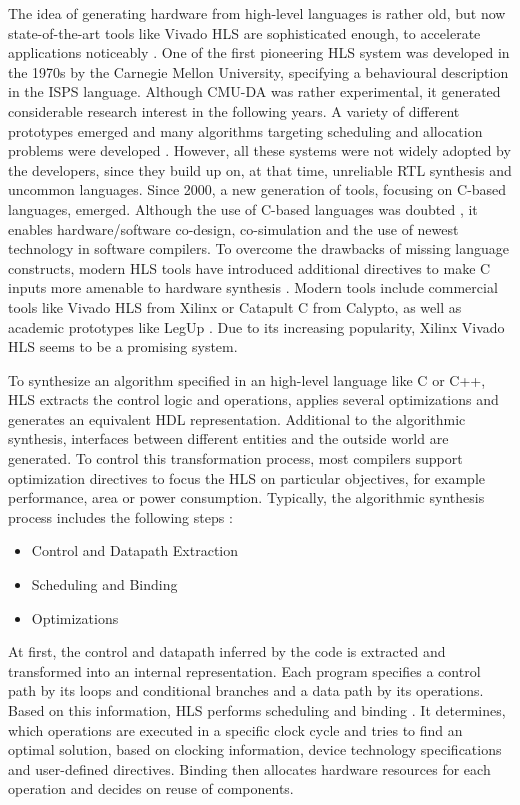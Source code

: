 The idea of generating hardware from high-level languages is rather old, but
now state-of-the-art tools like Vivado HLS are sophisticated enough, to
accelerate applications noticeably \citep{EcEc08,XSA10}. One of the first
pioneering \ac{HLS} system was developed in the 1970s \citep{DPS81} by the
Carnegie Mellon University, specifying a behavioural description in the
\ac{ISPS} language. Although \ac{CMU-DA} was rather experimental, it generated
considerable research interest in the following years. A variety of different
prototypes emerged and many algorithms targeting scheduling and allocation
problems were developed \citep{CBN11}. However, all these systems were not
widely adopted by the developers, since they build up on, at that time,
unreliable \ac{RTL} synthesis and uncommon languages. Since 2000, a new
generation of tools, focusing on C-based languages, emerged. Although the use
of C-based languages was doubted \citep{Edw06}, it enables hardware/software
co-design, co-simulation and the use of newest technology in software
compilers. To overcome the drawbacks of missing language constructs, modern
\ac{HLS} tools have introduced additional directives to make C inputs more
amenable to hardware synthesis \citep{CBN11}. Modern tools include commercial
tools like Vivado HLS from Xilinx or Catapult C from Calypto, as well as
academic prototypes like LegUp \citep{CCA11}. Due to its increasing
popularity, Xilinx Vivado HLS seems to be a promising system.

To synthesize an algorithm specified in an high-level language like C or C++,
\ac{HLS} extracts the control logic and operations, applies several
optimizations and generates an equivalent \ac{HDL} representation. Additional
to the algorithmic synthesis, interfaces between different entities and the
outside world are generated. To control this transformation process, most
compilers support optimization directives to focus the \ac{HLS} on particular
objectives, for example performance, area or power consumption. Typically, the
algorithmic synthesis process includes the following steps \citep{OCC14}:
\begin{itemize} 
	\item Control and Datapath Extraction
	\item Scheduling and Binding
	\item Optimizations
\end{itemize}
At first, the control and datapath inferred by the code is extracted and
transformed into an internal representation. Each program specifies a control
path by its loops and conditional branches and a data path by its operations.
Based on this information, \ac{HLS} performs scheduling and binding
\citep{OCC14}. It determines, which operations are executed in a specific
clock cycle and tries to find an optimal solution, based on clocking
information, device technology specifications and user-defined directives.
Binding then allocates hardware resources for each operation and decides on
reuse of components.

